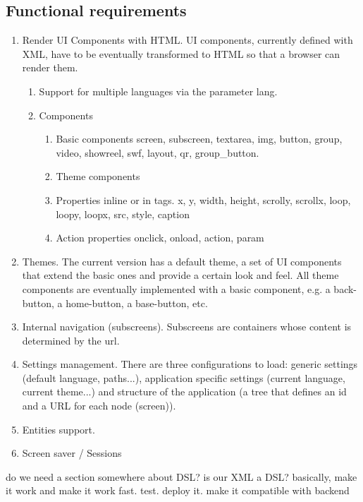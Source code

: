 \subsection{Functional requirements}
\begin{enumerate}
    \item Render UI Components with HTML. UI components, currently defined with XML, have to be eventually transformed to HTML so that a browser can render them.
    \begin{enumerate}
        \item Support for multiple languages via the parameter lang.
        \item Components 
        \begin{enumerate}
            \item Basic components screen, subscreen, textarea, img, button, group, video, showreel, swf, layout, qr, group\_button.
            \item Theme components
            \item Properties inline or in tags. x, y, width, height, scrolly, scrollx, loop, loopy, loopx, src, style, caption
            \item Action properties onclick, onload, action, param
        \end{enumerate}
        
    \end{enumerate}
    \item Themes. The current version has a default theme, a set of UI components that extend the basic ones and provide a certain look and feel. All theme components are eventually implemented with a basic component, e.g. a back-button, a home-button, a base-button, etc.
    \item Internal navigation (subscreens). Subscreens are containers whose content is determined by the url.
    \item Settings management. There are three configurations to load: generic settings (default language, paths...), application specific settings (current language, current theme...) and structure of the application (a tree that defines an id and a \ac{URL} for each node (screen)).
    \item Entities support. 
    \item Screen saver / Sessions
\end{enumerate}


do we need a section somewhere about DSL? is our XML a DSL?
basically, make it work and make it work fast. test. deploy it. make it compatible with backend

